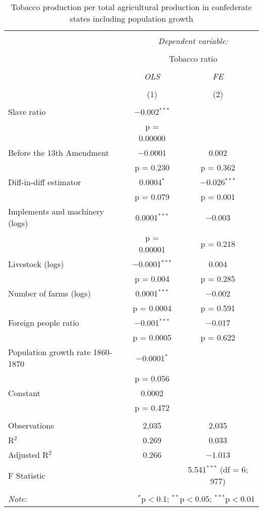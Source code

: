 \documentclass[12pt]{report}
\begin{document}
\begin{table}[!htbp] \centering 
  \caption{Tobacco production per total agricultural production in confederate states including population growth} 
  \label{tab:tobcsa} 
\begin{tabular}{@{\extracolsep{5pt}}lcc} 
\\[-1.8ex]\hline 
\hline \\[-1.8ex] 
 & \multicolumn{2}{c}{\textit{Dependent variable:}} \\ 
\cline{2-3} 
\\[-1.8ex] & \multicolumn{2}{c}{Tobacco ratio} \\ 
\\[-1.8ex] & \textit{OLS} & \textit{FE} \\ 
\\[-1.8ex] & (1) & (2)\\ 
\hline \\[-1.8ex] 
 Slave ratio & $-$0.002$^{***}$ &  \\ 
  & p = 0.00000 &  \\ 
  Before the 13th Amendment & $-$0.0001 & 0.002 \\ 
  & p = 0.230 & p = 0.362 \\ 
  Diff-in-diff estimator & 0.0004$^{*}$ & $-$0.026$^{***}$ \\ 
  & p = 0.079 & p = 0.001 \\ 
  Implements and machinery (logs) & 0.0001$^{***}$ & $-$0.003 \\ 
  & p = 0.00001 & p = 0.218 \\ 
  Livestock (logs) & $-$0.0001$^{***}$ & 0.004 \\ 
  & p = 0.004 & p = 0.285 \\ 
  Number of farms (logs) & 0.0001$^{***}$ & $-$0.002 \\ 
  & p = 0.0004 & p = 0.591 \\ 
  Foreign people ratio & $-$0.001$^{***}$ & $-$0.017 \\ 
  & p = 0.0005 & p = 0.622 \\ 
  Population growth rate 1860-1870 & $-$0.0001$^{*}$ &  \\ 
  & p = 0.056 &  \\ 
  Constant & 0.0002 &  \\ 
  & p = 0.472 &  \\ 
 \hline \\[-1.8ex] 
Observations & 2,035 & 2,035 \\ 
R$^{2}$ & 0.269 & 0.033 \\ 
Adjusted R$^{2}$ & 0.266 & $-$1.013 \\ 
F Statistic &  & 5.541$^{***}$ (df = 6; 977) \\ 
\hline 
\hline \\[-1.8ex] 
\textit{Note:}  & \multicolumn{2}{r}{$^{*}$p$<$0.1; $^{**}$p$<$0.05; $^{***}$p$<$0.01} \\ 
\end{tabular} 
\end{table} 


%
%
\end{document}
